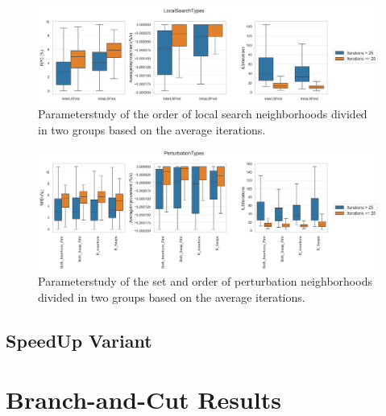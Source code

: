 \begin{figure}[!ht]
    \centering
    \includegraphics[width=\textwidth]{pictures/parameter_study/LocalSearchTypes_base_parameter_study.png}
    \caption{Parameterstudy of the order of local search neighborhoods divided in two groups based on the average iterations.}
    \label{fig:parameterstudy_NoClassifier_localSearch}
\end{figure}

\begin{figure}[!ht]
    \centering
    \includegraphics[width=\textwidth]{pictures/parameter_study/PerturbationTypes_base_parameter_study.png}
    \caption{Parameterstudy of the set and order of perturbation neighborhoods divided in two groups based on the average iterations.}
    \label{fig:parameterstudy_NoClassifier_perturbation}
\end{figure}

\subsection{SpeedUp Variant}
\label{app:subsec:parameterstudy_SpeedUp}

\section{Branch-and-Cut Results}

